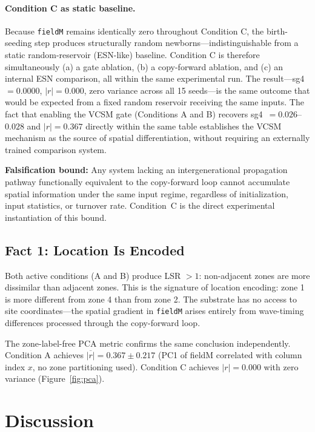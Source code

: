 \documentclass[11pt,twocolumn]{article}
\begin{document}
\paragraph{Condition C as static baseline.}
Because \texttt{fieldM} remains identically zero throughout Condition C,
the birth-seeding step produces structurally random newborns---indistinguishable
from a static random-reservoir (ESN-like) baseline.
Condition C is therefore simultaneously (a) a gate ablation, (b) a copy-forward
ablation, and (c) an internal ESN comparison, all within the same experimental
run. The result---sg4~$= 0.0000$, $|r| = 0.000$, zero variance across all 15
seeds---is the same outcome that would be expected from a fixed random reservoir
receiving the same inputs.
The fact that enabling the VCSM gate (Conditions A and B) recovers
sg4~$= 0.026$--$0.028$ and $|r| = 0.367$ directly within the same table
establishes the VCSM mechanism as the source of spatial differentiation,
without requiring an externally trained comparison system.

\textbf{Falsification bound:} Any system lacking an intergenerational propagation
pathway functionally equivalent to the copy-forward loop cannot accumulate spatial
information under the same input regime, regardless of initialization, input
statistics, or turnover rate. Condition~C is the direct experimental instantiation
of this bound.

\subsection{Fact 1: Location Is Encoded}

Both active conditions (A and B) produce LSR $> 1$: non-adjacent zones are
more dissimilar than adjacent zones. This is the signature of location encoding:
zone 1 is more different from zone 4 than from zone 2. The substrate has no
access to site coordinates---the spatial gradient in \texttt{fieldM} arises
entirely from wave-timing differences processed through the copy-forward loop.

The zone-label-free PCA metric confirms the same conclusion independently.
Condition A achieves $\overline{|r|} = 0.367 \pm 0.217$ (PC1 of fieldM
correlated with column index $x$, no zone partitioning used).
Condition C achieves $|r| = 0.000$ with zero variance (Figure~\ref{fig:pca}).

\section{Discussion}
\end{document}
